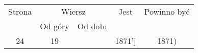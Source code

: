\documentclass[a4paper,11pt]{article}
\begin{document}
\vspace{0em}



\vspace{\spaceFive}


\begin{center}

  \begin{tabular}{|c|c|c|c|c|}
    \hline
    Strona & \multicolumn{2}{c|}{Wiersz} & Jest
                              & Powinno być \\ \cline{2-3}
    & Od góry & Od dołu & & \\
    \hline
    24 & 19 & & 1871'] & 1871) \\
    \hline
  \end{tabular}

\end{center}

\vspace{\spaceTwo}













{}






\end{document}
